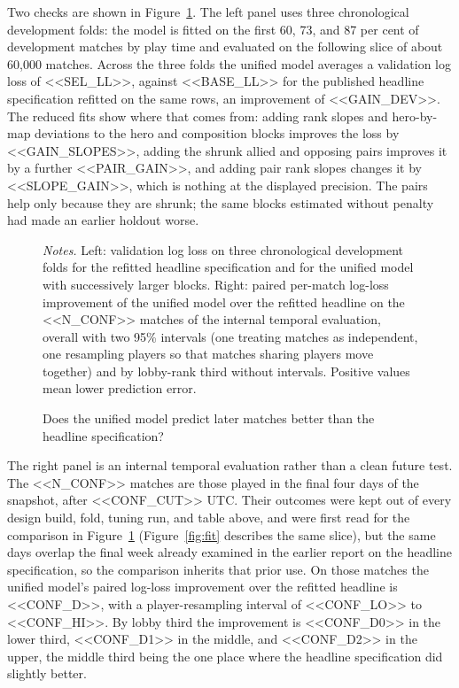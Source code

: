 \documentclass[11pt]{article}
\begin{document}
Two checks are shown in Figure~\ref{fig:pred}. The left panel uses three chronological development folds:
the model is fitted on the first 60, 73, and 87 per cent of development matches by play time and
evaluated on the following slice of about 60{,}000 matches. Across the three folds the unified model
averages a validation log loss of <<SEL_LL>>, against <<BASE_LL>> for the published headline specification
refitted on the same rows, an improvement of <<GAIN_DEV>>. The reduced fits show where that comes from:
adding rank slopes and hero-by-map deviations to the hero and composition blocks improves the loss by
<<GAIN_SLOPES>>, adding the shrunk allied and opposing pairs improves it by a further <<PAIR_GAIN>>, and
adding pair rank slopes changes it by <<SLOPE_GAIN>>, which is nothing at the displayed precision. The
pairs help only because they are shrunk; the same blocks estimated without penalty had made an earlier
holdout worse.

\begin{figure}[!tb]\centering
\caption{Does the unified model predict later matches better than the headline specification?}
\label{fig:pred}
\vspace{2pt}


\begin{minipage}{0.95\linewidth}\footnotesize\vspace{2pt}
\emph{Notes.} Left: validation log loss on three chronological development folds for the refitted headline
specification and for the unified model with successively larger blocks. Right: paired per-match log-loss
improvement of the unified model over the refitted headline on the <<N_CONF>> matches of the internal
temporal evaluation, overall with two 95\% intervals (one treating matches as independent, one resampling
players so that matches sharing players move together) and by lobby-rank third without intervals. Positive
values mean lower prediction error.
\end{minipage}
\end{figure}

The right panel is an internal temporal evaluation rather than a clean future test. The <<N_CONF>> matches
are those played in the final four days of the snapshot, after <<CONF_CUT>> UTC. Their outcomes were kept
out of every design build, fold, tuning run, and table above, and were first read for the comparison in
Figure~\ref{fig:pred} (Figure~\ref{fig:fit} describes the same slice), but the same days overlap
the final week already examined in the earlier report on the headline specification, so the comparison
inherits that prior use. On those matches the unified model's paired log-loss improvement over the
refitted headline is <<CONF_D>>, with a player-resampling interval of <<CONF_LO>> to <<CONF_HI>>. By lobby
third the improvement is <<CONF_D0>> in the lower third, <<CONF_D1>> in the middle, and <<CONF_D2>> in the
upper, the middle third being the one place where the headline specification did slightly better.
\end{document}
